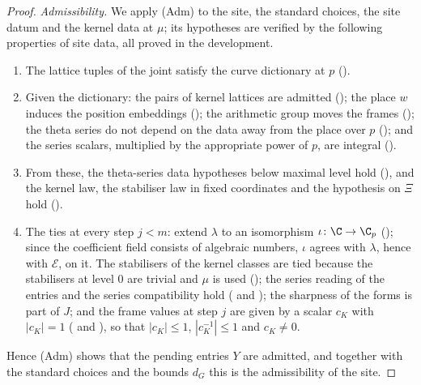 \begin{proof}
\emph{Admissibility.} We apply \textup{(Adm)} to the site, the standard choices, the site datum and the kernel data at
$\mu$; its hypotheses are verified by the following properties of site data, all proved in the development.
\begin{enumerate}
\item The lattice tuples of the joint satisfy the curve dictionary at $p$
  ().
\item Given the dictionary: the pairs of kernel lattices are admitted
  (); the place $w$ induces the position embeddings
  (); the arithmetic group moves the frames
  (); the theta series do not depend on the data away
  from the place over $p$ (); and the
  series scalars, multiplied by the appropriate power of $p$, are integral
  ().
\item From these, the theta-series data hypotheses below maximal level hold
  (), and the kernel law, the stabiliser law in fixed
  coordinates and the hypothesis on $\Xi$ hold
  ().
\item The ties at every step $j<m$: extend $\lambda$ to an isomorphism $\iota\colon\C\to\C_p$
  (); since the coefficient field consists of algebraic numbers,
  $\iota$ agrees with $\lambda$, hence with $\mathcal E$, on it. The stabilisers of the kernel classes are tied because the stabilisers at level $0$ are trivial
  and $\mu$ is used (); the series reading of the entries and the
  series compatibility hold ( and );
  the sharpness of the forms is part of $J$; and the frame values at step $j$ are given by a scalar $c_K$ with
  $|c_K|=1$ ( and ),
  so that $|c_K|\le1$, $|c_K^{-1}|\le1$ and $c_K\ne0$.
\end{enumerate}
Hence \textup{(Adm)} shows that the pending entries $Y$ are admitted, and together with the standard choices and the bounds
$d_G$ this is the admissibility of the site.
\end{proof}

